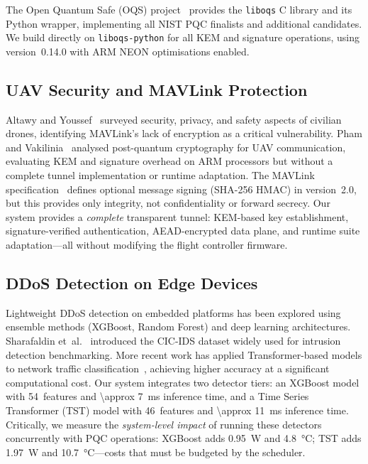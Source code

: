 \documentclass[conference]{IEEEtran}
\newcommand{\etal}{et~al.\xspace}
\begin{document}
The Open Quantum Safe (OQS) project~\cite{liboqs, oqspython} provides the \texttt{liboqs} C library and its Python wrapper, implementing all NIST PQC finalists and additional candidates.
We build directly on \texttt{liboqs-python} for all KEM and signature operations, using version~0.14.0 with ARM NEON optimisations enabled.

\subsection{UAV Security and MAVLink Protection}

Altawy and Youssef~\cite{drone-security-survey} surveyed security, privacy, and safety aspects of civilian drones, identifying MAVLink's lack of encryption as a critical vulnerability.
Pham and Vakilinia~\cite{drone-pqc-analysis} analysed post-quantum cryptography for UAV communication, evaluating KEM and signature overhead on ARM processors but without a complete tunnel implementation or runtime adaptation.
The MAVLink specification~\cite{mavlink-spec} defines optional message signing (SHA-256 HMAC) in version~2.0, but this provides only integrity, not confidentiality or forward secrecy.
Our system provides a \emph{complete} transparent tunnel: KEM-based key establishment, signature-verified authentication, AEAD-encrypted data plane, and runtime suite adaptation---all without modifying the flight controller firmware.

\subsection{DDoS Detection on Edge Devices}

Lightweight DDoS detection on embedded platforms has been explored using ensemble methods (XGBoost, Random Forest) and deep learning architectures. Sharafaldin \etal~\cite{cicids2017} introduced the CIC-IDS dataset widely used for intrusion detection benchmarking. More recent work has applied Transformer-based models to network traffic classification~\cite{tst-ids}, achieving higher accuracy at a significant computational cost.
Our system integrates two detector tiers: an XGBoost model with 54~features and \SI{\approx 7}{\milli\second} inference time, and a Time Series Transformer (TST) model with 46~features and \SI{\approx 11}{\milli\second} inference time.
Critically, we measure the \emph{system-level impact} of running these detectors concurrently with PQC operations: XGBoost adds \SI{0.95}{\watt} and \SI{4.8}{\celsius}; TST adds \SI{1.97}{\watt} and \SI{10.7}{\celsius}---costs that must be budgeted by the scheduler.
\end{document}
